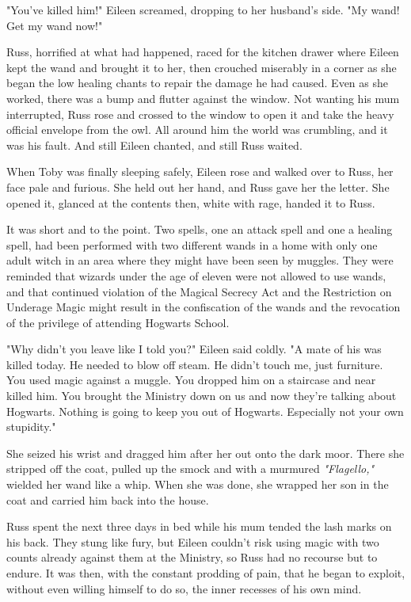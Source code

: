 \documentclass[a4paper,11pt]{article}
\begin{document}
"You've killed him!" Eileen screamed, dropping to her husband's side. "My wand! Get my wand now!"

Russ, horrified at what had happened, raced for the kitchen drawer where Eileen kept the wand and brought it to her, then crouched miserably in a corner as she began the low healing chants to repair the damage he had caused. Even as she worked, there was a bump and flutter against the window. Not wanting his mum interrupted, Russ rose and crossed to the window to open it and take the heavy official envelope from the owl. All around him the world was crumbling, and it was his fault. And still Eileen chanted, and still Russ waited.

When Toby was finally sleeping safely, Eileen rose and walked over to Russ, her face pale and furious. She held out her hand, and Russ gave her the letter. She opened it, glanced at the contents then, white with rage, handed it to Russ.

It was short and to the point. Two spells, one an attack spell and one a healing spell, had been performed with two different wands in a home with only one adult witch in an area where they might have been seen by muggles. They were reminded that wizards under the age of eleven were not allowed to use wands, and that continued violation of the Magical Secrecy Act and the Restriction on Underage Magic might result in the confiscation of the wands and the revocation of the privilege of attending Hogwarts School.

"Why didn't you leave like I told you?" Eileen said coldly. "A mate of his was killed today. He needed to blow off steam. He didn't touch me, just furniture. You used magic against a muggle. You dropped him on a staircase and near killed him. You brought the Ministry down on us and now they're talking about Hogwarts. Nothing is going to keep you out of Hogwarts. Especially not your own stupidity."

She seized his wrist and dragged him after her out onto the dark moor. There she stripped off the coat, pulled up the smock and with a murmured \emph{"Flagello,"} wielded her wand like a whip. When she was done, she wrapped her son in the coat and carried him back into the house.

Russ spent the next three days in bed while his mum tended the lash marks on his back. They stung like fury, but Eileen couldn't risk using magic with two counts already against them at the Ministry, so Russ had no recourse but to endure. It was then, with the constant prodding of pain, that he began to exploit, without even willing himself to do so, the inner recesses of his own mind.
\end{document}
